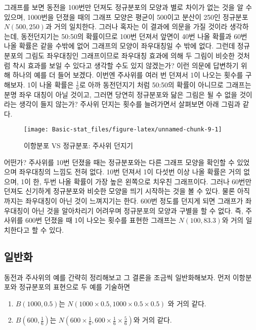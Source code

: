 \documentclass[]{book}
\providecommand{\tightlist}{%
  \setlength{\itemsep}{0pt}\setlength{\parskip}{0pt}}
\begin{document}
그래프를 보면 동전을 100번만 던져도 정규분포의 모양과 별로 차이가 없는 것을 알 수 있으며, 1000번을 던졌을 때의 그래프 모양은 평균이 500이고 분산이 250인 정규분포 \(N(500,250)\)과 거의 일치한다. 그러나 혹자는 이 결과에 의문을 가질 것이라 생각하는데, 동전던지기는 50:50의 확률이므로 100번 던져서 앞면이 40번 나올 확률과 60번 나올 확률은 같을 수밖에 없어 그래프의 모양이 좌우대칭일 수 밖에 없다. 그런데 정규분포의 그림도 좌우대칭인 그래프이므로 좌우대칭 효과에 의해 두 그림이 비슷한 것처럼 착시 효과를 보일 수 있다고 생각할 수도 있지 않겠는가? 이런 의문에 답변하기 위해 하나의 예를 더 들어 보겠다. 이번엔 주사위를 여러 번 던져서 1이 나오는 횟수를 구해보자. 1이 나올 확률은 \(\frac{1}{6}\)로 아까 동전던지기 처럼 50:50의 확률이 아니므로 그래프는 분명 좌우 대칭이 아닐 것이고, 그러면 당연히 정규분포와 닮은 그림은 될 수 없을 것이라는 생각이 들지 않는가? 주사위 던지는 횟수를 늘려가면서 살펴보면 아래 그림과 같다.

\begin{figure}

{\centering \texttt{[image: Basic-stat\_files/figure-latex/unnamed-chunk-9-1]} 

}

\caption{ 이항분포 VS 정규분포: 주사위 던지기}\label{fig:unnamed-chunk-9}
\end{figure}

어떤가? 주사위를 10번 던졌을 때는 정규분포와는 다른 그래프 모양을 확인할 수 있었으며 좌우대칭의 느낌도 전혀 없다. 10번 던져서 1이 다섯번 이상 나올 확률은 거의 없으며, 1이 한, 두번 나올 확률이 가장 높은 왼쪽으로 치우친 그래프이다. 그러나 60번만 던져도 신기하게 정규분포와 비슷한 모양을 띄기 시작하는 것을 볼 수 있다. 물론 아직까지는 좌우대칭이 아닌 것이 느껴지기는 한다. 600번 정도를 던지게 되면 그래프가 좌우대칭이 아닌 것을 알아차리기 어려우며 정규분포의 모양과 구별을 할 수 없다. 즉, 주사위를 600번 던졌을 때 1이 나오는 횟수를 표현한 그래프는 \(N(100,83.3)\)와 거의 일치한다고 할 수 있다.

\hypertarget{uxc77cuxbc18uxd654}{%
\subsection{일반화}\label{uxc77cuxbc18uxd654}}

동전과 주사위의 예를 간략히 정리해보고 그 결론을 조금씩 일반화해보자. 먼저 이항분포와 정규분포의 표현으로 두 예를 기술하면

\begin{enumerate}
\def\labelenumi{\arabic{enumi}.}
\tightlist
\item
  \(B(1000,0.5)\)는 \(N(1000\times 0.5, 1000\times 0.5 \times 0.5)\) 와 거의 같다.
\item
  \(B(600,\frac{1}{6})\)는 \(N(600\times \frac{1}{6}, 600\times \frac{1}{6} \times \frac{5}{6})\)와 거의 같다.
\end{enumerate}
\end{document}
